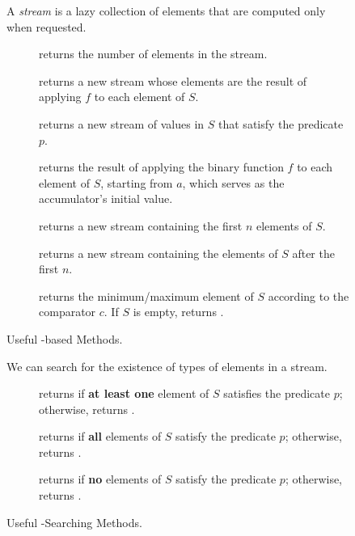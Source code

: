 \begin{figure}[tp]
  \small
  \begin{tcolorbox}[title=Java Streams]
    A \textit{stream} is a lazy collection of elements that are computed only when requested.
    \vspace{2ex}
  \begin{description}
    \item [] returns the number of elements in the stream.
    \item [] returns a new stream whose elements are the result of applying $f$ to each element of $S$.
    \item [] returns a new stream of values in $S$ that satisfy the predicate $p$.
    \item [] returns the result of applying the binary function $f$ to each element of $S$, starting from $a$, which serves as the accumulator's initial value.
    \item [] returns a new stream containing the first $n$ elements of $S$.
    \item [] returns a new stream containing the elements of $S$ after the first $n$.
    \item [] returns the minimum/maximum element of $S$ according to the comparator $c$. If $S$ is empty, returns .
  \end{description}
\end{tcolorbox}
  \caption{Useful -based Methods.}
  \label{fig:streams}
\end{figure}

\begin{figure}[tp]
  \small
  \begin{tcolorbox}[title=Java Stream--Searching Methods]
    We can search for the existence of types of elements in a stream.
    \vspace{2ex}
  \begin{description}
    \item [] returns  if \textbf{at least one} element of $S$ satisfies the predicate $p$; otherwise, returns .
    \item [] returns  if \textbf{all} elements of $S$ satisfy the predicate $p$; otherwise, returns .
    \item [] returns  if \textbf{no} elements of $S$ satisfy the predicate $p$; otherwise, returns .
  \end{description}
\end{tcolorbox}
  \caption{Useful -Searching Methods.}
  \label{fig:streams-searching}
\end{figure}

